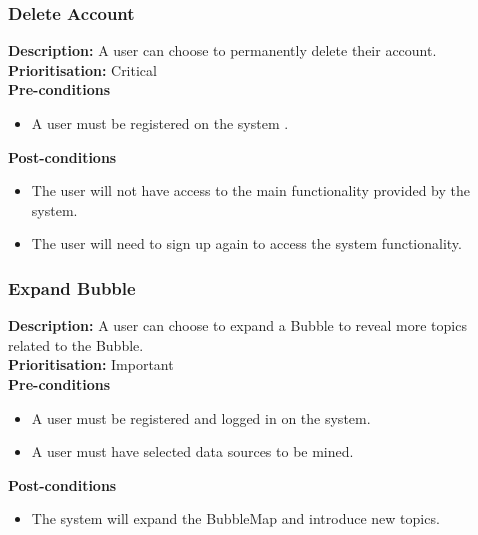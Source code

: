 \documentclass[hidelinks,english]{article}
\begin{document}
    		\subsubsection{Delete Account}
				\textbf{Description:}  A user can choose to permanently delete their account.
				\\
    			\textbf{Prioritisation:} Critical\\
      			\textbf{Pre-conditions}
    			\begin{itemize}
        			\item A user must be registered on the system .
    			\end{itemize}
    			\textbf{Post-conditions}
     			\begin{itemize}
        			\item The user will not have access to the main functionality provided by the system.
        			\item The user will need to sign up again to access the system functionality.
    			\end{itemize}
		    \subsubsection{Expand Bubble}
				\textbf{Description:}  A user can choose to expand a Bubble to reveal more topics related to the Bubble.
				\\
			    \textbf{Prioritisation:} Important\\
      			\textbf{Pre-conditions}
			    \begin{itemize}
			        \item A user must be registered and logged in on the system.
			        \item A user must have selected data sources to be mined.
			    \end{itemize}
			    \textbf{Post-conditions}
			     \begin{itemize}
			        \item The system will expand the BubbleMap and introduce new topics.
			    \end{itemize}
\end{document}
